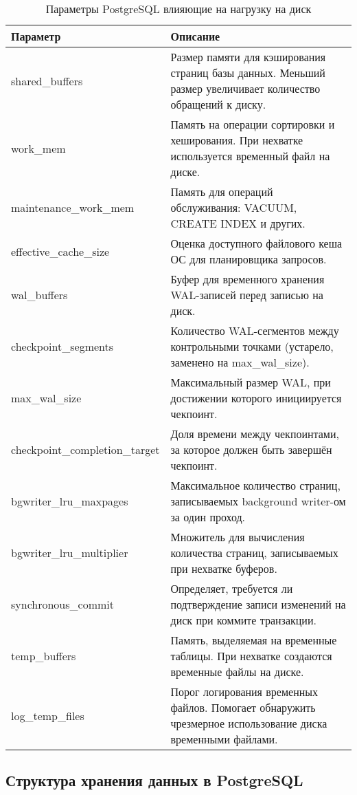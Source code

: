 \begin{table}[h!]
\centering
\vspace{0.5em}
\begin{tabular}{|L{0.3\textwidth}|L{0.6\textwidth}|}
\hline
\textbf{Параметр} & \textbf{Описание} \\
\hline
shared\_buffers & Размер памяти для кэширования страниц базы данных. Меньший размер увеличивает количество обращений к диску. \\
\hline
work\_mem & Память на операции сортировки и хеширования. При нехватке используется временный файл на диске. \\
\hline
maintenance\_work\_mem & Память для операций обслуживания: VACUUM, CREATE INDEX и других. \\
\hline
effective\_cache\_size & Оценка доступного файлового кеша ОС для планировщика запросов. \\
\hline
wal\_buffers & Буфер для временного хранения WAL-записей перед записью на диск. \\
\hline
checkpoint\_segments & Количество WAL-сегментов между контрольными точками (устарело, заменено на max\_wal\_size). \\
\hline
max\_wal\_size & Максимальный размер WAL, при достижении которого инициируется чекпоинт. \\
\hline
checkpoint\_completion\_target & Доля времени между чекпоинтами, за которое должен быть завершён чекпоинт. \\
\hline
bgwriter\_lru\_maxpages & Максимальное количество страниц, записываемых background writer-ом за один проход. \\
\hline
bgwriter\_lru\_multiplier & Множитель для вычисления количества страниц, записываемых при нехватке буферов. \\
\hline
synchronous\_commit & Определяет, требуется ли подтверждение записи изменений на диск при коммите транзакции. \\
\hline
temp\_buffers & Память, выделяемая на временные таблицы. При нехватке создаются временные файлы на диске. \\
\hline
log\_temp\_files & Порог логирования временных файлов. Помогает обнаружить чрезмерное использование диска временными файлами. \\
\hline
\end{tabular}
\caption{Параметры PostgreSQL влияющие на нагрузку на диск}
\label{tab:io_approaches}
\end{table}


\subsection{Структура хранения данных в PostgreSQL}

